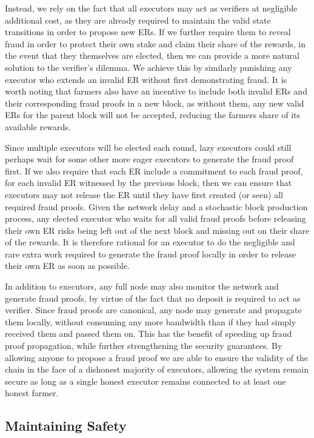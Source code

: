 \documentclass[conference]{IEEEtran}
\begin{document}
Instead, we rely on the fact that all executors may act as verifiers at negligible additional cost, as they are already required to maintain the valid state transitions in order to propose new ERs. If we further require them to reveal fraud in order to protect their own stake and claim their share of the rewards, in the event that they themselves are elected, then we can provide a more natural solution to the verifier’s dilemma. We achieve this by similarly punishing any executor who extends an invalid ER without first demonstrating fraud. It is worth noting that farmers also have an incentive to include both invalid ERs and their corresponding fraud proofs in a new block, as without them, any new valid ERs for the parent block will not be accepted, reducing the farmers share of its available rewards.

Since multiple executors will be elected each round, lazy executors could still perhaps wait for some other more eager executors to generate the fraud proof first. If we also require that each ER include a commitment to each fraud proof, for each invalid ER witnessed by the previous block, then we can ensure that executors may not release the ER until they have first created (or seen) all required fraud proofs. Given the network delay and a stochastic block production process, any elected executor who waits for all valid fraud proofs before releasing their own ER risks being left out of the next block and missing out on their share of the rewards. It is therefore rational for an executor to do the negligible and rare extra work required to generate the fraud proof locally in order to release their own ER as soon as possible.

In addition to executors, any full node may also monitor the network and generate fraud proofs, by virtue of the fact that no deposit is required to act as verifier. Since fraud proofs are canonical, any node may generate and propagate them locally, without consuming any more bandwidth than if they had simply received them and passed them on. This has the benefit of speeding up fraud proof propagation, while further strengthening the security guarantees. By allowing anyone to propose a fraud proof we are able to ensure the validity of the chain in the face of a dishonest majority of executors, allowing the system remain secure as long as a single honest executor remains connected to at least one honest farmer.

\subsection{Maintaining Safety}
\end{document}
